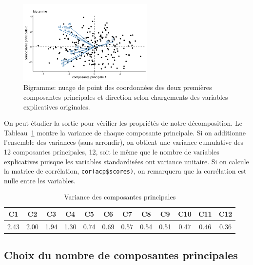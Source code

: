 \documentclass[
  11pt,
  letterpaper,
]{scrbook}
\theoremstyle{definition}
\theoremstyle{remark}
\begin{document}
\begin{figure}[ht!]

{\centering \includegraphics[width=0.6\textwidth,height=\textheight]{analysefactorielle_files/figure-pdf/fig-biplot-1.pdf}

}

\caption{\label{fig-biplot}Bigramme: nuage de point des coordonnées des
deux premières composantes principales et direction selon chargements
des variables explicatives originales.}

\end{figure}

On peut étudier la sortie pour vérifier les propriétés de notre
décomposition. Le Tableau~\ref{tbl-eigenvalues} montre la variance de
chaque composante principale. Si on additionne l'ensemble des variances
(sans arrondir), on obtient une variance cumulative des 12 composantes
principales, 12, soit le même que le nombre de variables explicatives
puisque les variables standardisées ont variance unitaire. Si on calcule
la matrice de corrélation, \texttt{cor(acp\$scores)}, on remarquera que
la corrélation est nulle entre les variables.

\hypertarget{tbl-eigenvalues}{}
\begin{table}
\caption{\label{tbl-eigenvalues}Variance des composantes principales }\tabularnewline

\centering
\begin{tabular}{cccccccccccc}
\toprule
C1 & C2 & C3 & C4 & C5 & C6 & C7 & C8 & C9 & C10 & C11 & C12\\
\midrule
2.43 & 2.00 & 1.94 & 1.30 & 0.74 & 0.69 & 0.57 & 0.54 & 0.51 & 0.47 & 0.46 & 0.36\\
\bottomrule
\end{tabular}
\end{table}

\hypertarget{sec-acp-choix}{%
\subsection{Choix du nombre de composantes
principales}\label{sec-acp-choix}}
\end{document}
